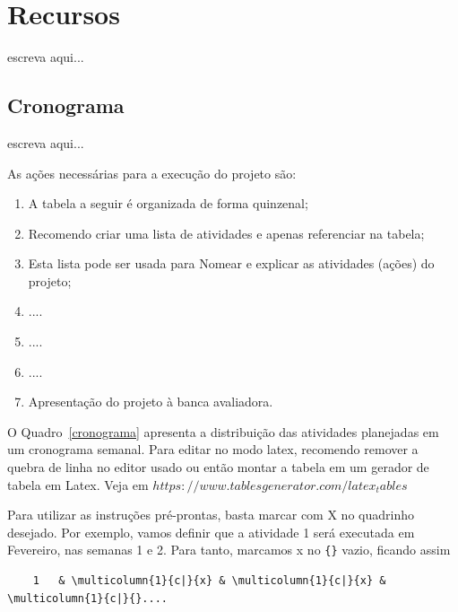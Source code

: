 \section{Recursos}
escreva aqui...

\subsection{Cronograma}
escreva aqui...

As ações necessárias para a execução do projeto são:
\begin{enumerate}
	\item A tabela a seguir é organizada de forma quinzenal;
	\item Recomendo criar uma lista de atividades e apenas referenciar na tabela;
	\item Esta lista pode ser usada para Nomear e explicar as atividades (ações) do projeto;
	\item ....
	\item ....
	\item ....
	\item Apresentação do projeto à banca avaliadora.
\end{enumerate}

O Quadro~\ref{cronograma} apresenta a distribuição das atividades planejadas em um cronograma semanal. Para editar no modo latex, recomendo remover a quebra de linha no editor usado ou então montar a tabela em um gerador de tabela em Latex. Veja em $https://www.tablesgenerator.com/latex_tables$

Para utilizar as instruções pré-prontas, basta marcar com X no quadrinho desejado. Por exemplo, vamos definir que a atividade 1 será executada em Fevereiro, nas semanas 1 e 2. Para tanto, marcamos x no \verb*|{}| vazio, ficando assim 
\begin{verbatim}
	1	& \multicolumn{1}{c|}{x} & \multicolumn{1}{c|}{x} & \multicolumn{1}{c|}{}....
\end{verbatim}





